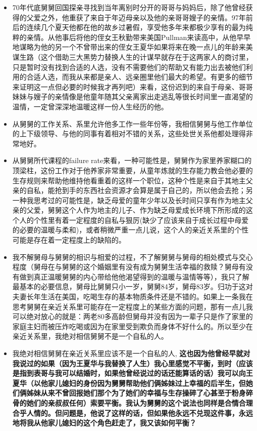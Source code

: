 \documentclass[9pt, b5paper]{article}
\begin{document}
\begin{enumerate}
\begin{itemize}
\item 70年代底舅舅回国探亲寻找到当年离别时分开的哥哥与妈妈后，除了他曾经获得的父爱之外，他重获了来自于年迈母亲以及他的亲哥哥嫂子的亲情。97年前后的连续几个夏天他都在他的故乡过暑假，享受他多年来都极少享有的最为纯粹的亲情。从他事后将他的侄女王秋勤带来美国Pullman来读高中，从他早早地谋略为他的另一个不曾带出来的侄女王夏华如果将来在晚一点儿的年龄来美谋生路（这个借助三大黑势力替换人生的计谋早就存在于这两家人的商讨里，只是暂时没有找到合适的人选，没有不需要他们的帮助又有能力出去被他们利用的合适人选，而我从来都是亲人、远亲圈里他们最大的希望。有更多的细节来证明这一点但必要的时候我才再列吧）来看，这份迟到的来自于母亲、哥哥妹妹与嫂子的亲情像是他童年随其父亲离家出走逃乱等很长时间里一直渴望的温情，一定曾深深地温暖这样一份人生经历的他。
\item 从舅舅的工作关系、系里允许他多工作一些年份等，我相信舅舅与他工作单位的上下级领导、与他的同事有着相对不错的关系，这些处世关系他都处理得非常地好。
\item 从舅舅所代课程的failure rate来看，一种可能性是，舅舅作为家里养家糊口的顶梁柱，这份工作对于他养家非常重要，从童年炼就的生存能力教会他必要的生存规则来帮助他维持他看重着的这样一个职位，这种个性是来自于其地主父亲的自私，能抢到手的东西社会资源才会算是属于自己的，所以他会去抢；另一种我思考过的可能性是，缺乏母爱的童年少年以及长时间只享有作为地主父亲的父爱，舅舅这个人作为地主的儿子、作为缺乏母爱成长环境下所形成的这个人的个性里有着一定程度的自私与狠厉(缺少了应该来自于成长过程中母爱的必要的温暖与柔和)，或者稍微严重一点儿说，这个人的亲近关系里的个性可能是存在着一定程度上的缺陷的。
\item 我不解舅母与舅舅的相识与相爱的过程，不了解舅舅与舅母的相处模式与交心程度（舅母在与舅舅的这个婚姻里有没有成为舅舅生活幸福的救赎？舅母有没有做到真正温暖舅舅的内心带给他他渴望得到的温暖与温情等等），我只了解最基本的必要信息，舅母比舅舅只小一岁，舅舅84岁，舅母83岁。归功于这对夫妻长年生活在美国，吃喝生存的基本物质条件还是不错的。如果上一条我在思考舅舅在亲近关系里可能存在一定程度上的某些方面的问题，那有一点儿我可以绝对放心的就是：两老80多高龄但舅母并没有因为一辈子只是作了家里的家庭主妇而被压炸吃喝或因为在家里受到欺负而身体不好什么的。所以至少在亲近关系里，我绝对相信舅舅不是一个自私的人。
\item 我绝对相信舅舅在亲近关系里应该不是一个自私的人, \textbf{这也因为他曾经早就对我说过的如果（因为王夏华与我替换了人生）我心里感觉不平衡，到时（应该是指到表哥与我可以结婚时，如果他曾经说过的话还能算话的话）我可以向王夏华（以他家儿媳妇的身份因为舅舅帮助他们俩姊妹过上幸福的后半生，但她们俩姊妹从来不曾回报她们那个为了她们的幸福与生存操碎了心甚至于粉身碎骨的她们的亲叔叔任何）索要平衡。我认为舅舅的这个说法也同样是合情合理合乎人情的。但问题是，他说了这样的话，但如果他永远不兑现这件事，永远地将我从他家儿媳妇的这个角色赶走了，我又该如何平衡？}

\end{itemize}
\end{enumerate}
\end{document}

